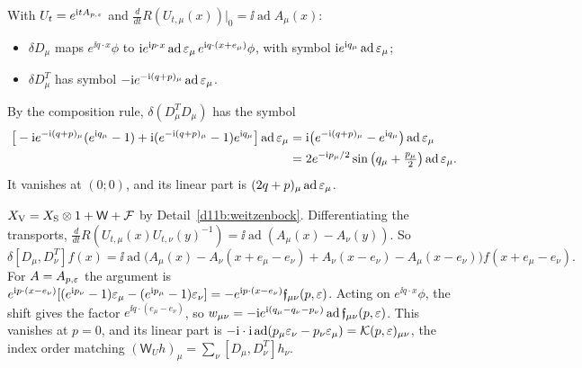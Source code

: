 \begin{step}
With $U_t=e^{\mathrm i tA_{p,\varepsilon}}$ and $\frac d{dt}R(U_{t,\mu}(x))|_0=\ii\operatorname{ad}A_\mu(x)$:
\begin{itemize}
\item $\delta D_\mu$ maps $e^{\ii q\cdot x}\phi$ to $\mathrm i e^{\mathrm i p\cdot x}\operatorname{ad}\varepsilon_\mu\,e^{\mathrm i q\cdot(x+e_\mu)}\phi$, with symbol $\mathrm i e^{\mathrm i q_\mu}\operatorname{ad}\varepsilon_\mu$;
\item $\delta D_\mu^T$ has symbol $-\mathrm i e^{-\mathrm i(q+p)_\mu}\operatorname{ad}\varepsilon_\mu$.
\end{itemize}
By the composition rule, $\delta(D_\mu^TD_\mu)$ has the symbol
\[
\begin{aligned}
\big[-\mathrm i e^{-\mathrm i(q+p)_\mu}(e^{\mathrm i q_\mu}-1)+\mathrm i(e^{-\mathrm i(q+p)_\mu}-1)e^{\mathrm i q_\mu}\big]\operatorname{ad}\varepsilon_\mu&=\mathrm i\big(e^{-\mathrm i(q+p)_\mu}-e^{\mathrm i q_\mu}\big)\operatorname{ad}\varepsilon_\mu\\
&=2e^{-\mathrm i p_\mu/2}\sin\big(q_\mu+\tfrac{p_\mu}2\big)\operatorname{ad}\varepsilon_\mu .
\end{aligned}
\]
It vanishes at $(0;0)$, and its linear part is $(2q+p)_\mu\operatorname{ad}\varepsilon_\mu$.
\end{step}

\begin{step}
$X_{\rm V}=X_{\rm S}\otimes1+\mathsf W+\mathcal F$ by Detail~\ref{d11b:weitzenbock}. Differentiating the transports, $\frac d{dt}R(U_{t,\mu}(x)U_{t,\nu}(y)^{-1})=\ii\operatorname{ad}(A_\mu(x)-A_\nu(y))$. So
\[
\delta[D_\mu,D_\nu^T]f(x)=\ii\operatorname{ad}\big(A_\mu(x)-A_\nu(x+e_\mu-e_\nu)+A_\nu(x-e_\nu)-A_\mu(x-e_\nu)\big)f(x+e_\mu-e_\nu).
\]
For $A=A_{p,\varepsilon}$ the argument is $e^{\mathrm i p\cdot(x-e_\nu)}[(e^{\mathrm i p_\nu}-1)\varepsilon_\mu-(e^{\mathrm i p_\mu}-1)\varepsilon_\nu]=-e^{\mathrm i p\cdot(x-e_\nu)}\mathfrak f_{\mu\nu}(p,\varepsilon)$. Acting on $e^{\ii q\cdot x}\phi$, the shift gives the factor $e^{\ii q\cdot(e_\mu-e_\nu)}$, so $w_{\mu\nu}=-\mathrm i e^{\mathrm i(q_\mu-q_\nu-p_\nu)}\operatorname{ad}\mathfrak f_{\mu\nu}(p,\varepsilon)$. This vanishes at $p=0$, and its linear part is $-\mathrm i\cdot\mathrm i\operatorname{ad}(p_\mu\varepsilon_\nu-p_\nu\varepsilon_\mu)=\mathcal K(p,\varepsilon)_{\mu\nu}$, the index order matching $(\mathsf W_Uh)_\mu=\sum_\nu[D_\mu,D_\nu^T]h_\nu$.
\end{step}

